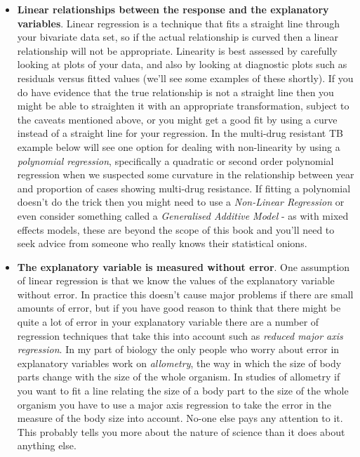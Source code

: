 \documentclass[
]{book}
\begin{document}
\begin{itemize}
\item
  \textbf{Linear relationships between the response and the explanatory variables}. Linear regression is a technique that fits a straight line through your bivariate data set, so if the actual relationship is curved then a linear relationship will not be appropriate. Linearity is best assessed by carefully looking at plots of your data, and also by looking at diagnostic plots such as residuals versus fitted values (we'll see some examples of these shortly). If you do have evidence that the true relationship is not a straight line then you might be able to straighten it with an appropriate transformation, subject to the caveats mentioned above, or you might get a good fit by using a curve instead of a straight line for your regression. In the multi-drug resistant TB example below will see one option for dealing with non-linearity by using a \emph{polynomial regression}, specifically a quadratic or second order polynomial regression when we suspected some curvature in the relationship between year and proportion of cases showing multi-drug resistance. If fitting a polynomial doesn't do the trick then you might need to use a \emph{Non-Linear Regression} or even consider something called a \emph{Generalised Additive Model} - as with mixed effects models, these are beyond the scope of this book and you'll need to seek advice from someone who really knows their statistical onions.
\item
  \textbf{The explanatory variable is measured without error}. One assumption of linear regression is that we know the values of the explanatory variable without error. In practice this doesn't cause major problems if there are small amounts of error, but if you have good reason to think that there might be quite a lot of error in your explanatory variable there are a number of regression techniques that take this into account such as \emph{reduced major axis regression}. In my part of biology the only people who worry about error in explanatory variables work on \emph{allometry}, the way in which the size of body parts change with the size of the whole organism. In studies of allometry if you want to fit a line relating the size of a body part to the size of the whole organism you have to use a major axis regression to take the error in the measure of the body size into account. No-one else pays any attention to it. This probably tells you more about the nature of science than it does about anything else.
\end{itemize}
\end{document}
